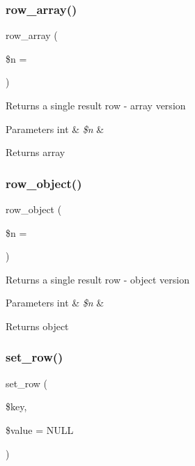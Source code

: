 \subsubsection{\texorpdfstring{row\+\_\+array()}{row\_array()}}
{\footnotesize\ttfamily row\+\_\+array (\begin{DoxyParamCaption}\item[{}]{\$n = {} }\end{DoxyParamCaption})}

Returns a single result row -\/ array version


\begin{DoxyParams}[1]{Parameters}
int & {\em \$n} & \\
\hline
\end{DoxyParams}
\begin{DoxyReturn}{Returns}
array 
\end{DoxyReturn}
\mbox{\label{class_c_i___d_b__result_a0bd3520c57f5cb192bdfaeed1f597c0a}} 
\subsubsection{\texorpdfstring{row\+\_\+object()}{row\_object()}}
{\footnotesize\ttfamily row\+\_\+object (\begin{DoxyParamCaption}\item[{}]{\$n = {} }\end{DoxyParamCaption})}

Returns a single result row -\/ object version


\begin{DoxyParams}[1]{Parameters}
int & {\em \$n} & \\
\hline
\end{DoxyParams}
\begin{DoxyReturn}{Returns}
object 
\end{DoxyReturn}
\mbox{\label{class_c_i___d_b__result_a77628e90fac65184ec9f583e7c30a48a}} 
\subsubsection{\texorpdfstring{set\+\_\+row()}{set\_row()}}
{\footnotesize\ttfamily set\+\_\+row (\begin{DoxyParamCaption}\item[{}]{\$key,  }\item[{}]{\$value = {\ttfamily NULL} }\end{DoxyParamCaption})}

